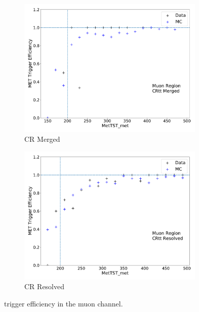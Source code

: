 \begin{figure}[tb]
  \centering
     \begin{subfigure}{0.49\textwidth}
     \includegraphics[width = 0.98\textwidth]{Figures/4/trig/trig_mu/CRtt Merged/MetTST_met.pdf}
     \caption{\ttbar CR Merged}
     \end{subfigure}
     \begin{subfigure}{0.49\textwidth}
     \includegraphics[width = 0.98\textwidth]{Figures/4/trig/trig_mu/CRtt Resolved/MetTST_met.pdf}
     \caption{\ttbar CR Resolved}
     \end{subfigure}
  \caption{\met trigger efficiency in the muon channel.}
  \label{fig:trig_mu}
\end{figure}

